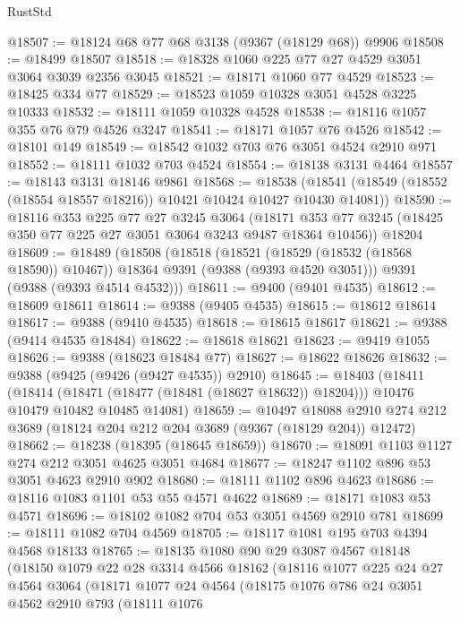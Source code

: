 \begin{lexlean}{RustStd}
\begin{coremodule}
@18507 := @18124 @68 @77 @68 @3138 (@9367 (@18129 @68)) @9906
@18508 := @18499 @18507
@18518 := @18328 @1060 @225 @77 @27 @4529 @3051 @3064 @3039 @2356 @3045
@18521 := @18171 @1060 @77 @4529
@18523 := @18425 @334 @77
@18529 := @18523 @1059 @10328 @3051 @4528 @3225 @10333
@18532 := @18111 @1059 @10328 @4528
@18538 := @18116 @1057 @355 @76 @79 @4526 @3247
@18541 := @18171 @1057 @76 @4526
@18542 := @18101 @149
@18549 := @18542 @1032 @703 @76 @3051 @4524 @2910 @971
@18552 := @18111 @1032 @703 @4524
@18554 := @18138 @3131 @4464
@18557 := @18143 @3131 @18146 @9861
@18568 := @18538
    (@18541 (@18549 (@18552 (@18554 @18557 @18216)) @10421 @10424 @10427 @10430 @14081))
@18590 := @18116
    @353
    @225
    @77
    @27
    @3245
    @3064
    (@18171 @353 @77 @3245 (@18425 @350 @77 @225 @27 @3051 @3064 @3243 @9487 @18364 @10456))
    @18204
@18609 := @18489
    (@18508
      (@18518
        (@18521 (@18529 (@18532 (@18568 @18590)) @10467))
        @18364
        @9391
        (@9388 (@9393 @4520 @3051)))
      @9391
      (@9388 (@9393 @4514 @4532)))
@18611 := @9400 (@9401 @4535)
@18612 := @18609 @18611
@18614 := @9388 (@9405 @4535)
@18615 := @18612 @18614
@18617 := @9388 (@9410 @4535)
@18618 := @18615 @18617
@18621 := @9388 (@9414 @4535 @18484)
@18622 := @18618 @18621
@18623 := @9419 @1055
@18626 := @9388 (@18623 @18484 @77)
@18627 := @18622 @18626
@18632 := @9388 (@9425 (@9426 (@9427 @4535)) @2910)
@18645 := @18403
    (@18411
      (@18414 (@18471 (@18477 (@18481 (@18627 @18632)) @18204)))
      @10476
      @10479
      @10482
      @10485
      @14081)
@18659 := @10497
    @18088
    @2910
    @274
    @212
    @3689
    (@18124 @204 @212 @204 @3689 (@9367 (@18129 @204)) @12472)
@18662 := @18238 (@18395 (@18645 @18659))
@18670 := @18091 @1103 @1127 @274 @212 @3051 @4625 @3051 @4684
@18677 := @18247 @1102 @896 @53 @3051 @4623 @2910 @902
@18680 := @18111 @1102 @896 @4623
@18686 := @18116 @1083 @1101 @53 @55 @4571 @4622
@18689 := @18171 @1083 @53 @4571
@18696 := @18102 @1082 @704 @53 @3051 @4569 @2910 @781
@18699 := @18111 @1082 @704 @4569
@18705 := @18117 @1081 @195 @703 @4394 @4568 @18133
@18765 := @18135
    @1080
    @90
    @29
    @3087
    @4567
    @18148
    (@18150
      @1079
      @22
      @28
      @3314
      @4566
      @18162
      (@18116
        @1077
        @225
        @24
        @27
        @4564
        @3064
        (@18171
          @1077
          @24
          @4564
          (@18175
            @1076
            @786
            @24
            @3051
            @4562
            @2910
            @793
            (@18111
              @1076

\end{coremodule}
\end{lexlean}
